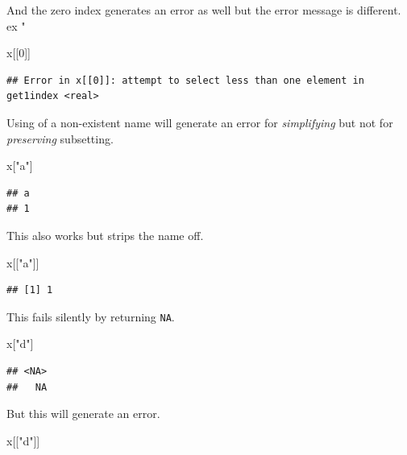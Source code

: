 \documentclass[
]{book}
\newenvironment{Shaded}{\begin{snugshade}}{\end{snugshade}}
\newcommand{\DecValTok}[1]{\textcolor[rgb]{0.00,0.00,0.81}{#1}}
\newcommand{\NormalTok}[1]{#1}
\newcommand{\StringTok}[1]{\textcolor[rgb]{0.31,0.60,0.02}{#1}}
\begin{document}
And the zero index generates an error as well but the error message is different.
ex "

\begin{Shaded}
\begin{Highlighting}[]
\NormalTok{x[[}\DecValTok{0}\NormalTok{]]}
\end{Highlighting}
\end{Shaded}

\begin{verbatim}
## Error in x[[0]]: attempt to select less than one element in get1index <real>
\end{verbatim}

Using of a non-existent name will generate an error for \emph{simplifying} but not for \emph{preserving} subsetting.

\begin{Shaded}
\begin{Highlighting}[]
\NormalTok{x[}\StringTok{"a"}\NormalTok{]}
\end{Highlighting}
\end{Shaded}

\begin{verbatim}
## a 
## 1
\end{verbatim}

This also works but strips the name off.

\begin{Shaded}
\begin{Highlighting}[]
\NormalTok{x[[}\StringTok{"a"}\NormalTok{]]}
\end{Highlighting}
\end{Shaded}

\begin{verbatim}
## [1] 1
\end{verbatim}

This fails silently by returning \texttt{NA}.

\begin{Shaded}
\begin{Highlighting}[]
\NormalTok{x[}\StringTok{"d"}\NormalTok{]}
\end{Highlighting}
\end{Shaded}

\begin{verbatim}
## <NA> 
##   NA
\end{verbatim}

But this will generate an error.

\begin{Shaded}
\begin{Highlighting}[]
\NormalTok{x[[}\StringTok{"d"}\NormalTok{]]}
\end{Highlighting}
\end{Shaded}
\end{document}
